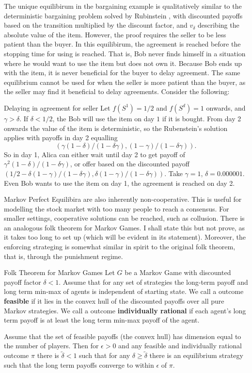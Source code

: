 The unique equilibirum in the bargaining example is qualitatively similar to the deterministic bargaining problem solved by Rubinstein \cite{Cripps1998}, with discounted payoffs based on the transition multiplied by the discount factor, and $v_\delta$ describing the absolute value of the item. However, the proof requires the seller to be less patient than the buyer. In this equilibirum, the agreement is reached before the stopping time for using is reached. That is, Bob never finds himself in a situation where he would want to use the item but does not own it. Because Bob ends up with the item, it is never beneficial for the buyer to delay agreement. The same equilibrium cannot be used for when the seller is more patient than the buyer, as the seller may find it beneficial to delay agreements. Consider the following:\begin{aexample}{Delaying in agreement for seller}{}
    Let $f(S^1)={1/2}$ and $f(S^d)=1$ onwards, and $\gamma >\delta$. If $\delta<1/2$, the Bob will use the item on day $1$ if it is bought. From day 2 onwards the value of the item is deterministic, so the Rubenstein's solution applies with payoffs in day 2 equalling \[
    (\gamma (1-\delta)/(1-\delta\gamma), (1-\gamma)/(1-\delta\gamma)).
    \] 
    So in day 1, Alica can either wait until day 2 to get payoff of $\gamma^2 (1-\delta)/(1-\delta\gamma)$, or offer based on the discounted payoff $(1/2 - \delta(1-\gamma)/(1-\delta\gamma),\delta(1-\gamma)/(1-\delta\gamma))$. Take $\gamma=1$, $\delta = 0.000001$. Even Bob wants to use the item on day 1, the agreement is reached on day 2.
\end{aexample}

Markov Perfect Equilibira are also inherently non-cooperative. This is useful for modelling the stock market with too many people to reach a consensus. For smaller settings, cooperative solutions can be reached, such as collusion. There is an analogous folk theorem for Markov Games. I shall state this but not prove, as it takes too long to set up (which will be evident in its statement). Moreover, the enforcing strateging is somewhat similar in spirit to the original folk theorem, that is, through the punishment regime. \begin{atheorem}{Folk Theorem for Markov Games \cite{Dutta1995}}{}
    Let $G$ be a Markov Game with discounted payoff factor $\delta<1$. Assume that for any set of strategies the long-term payoff and long term min-max of agents is independent of starting state.
    We call a outcome \textbf{feasible} if it lies in the convex hull of the discounted payoffs over all pure Markov strategies. We call a outcome \textbf{individually rational} if each agent's long term payoff is at least the long term min-max payoff of the agent. 
    
    Assume that the set of feasible payoffs (the convex hull) has dimension equal to the number of players. Then for $\epsilon>0$ and any feasible and individually rational outcome $\pi$ there is $\tilde{\delta}<1$ such that for any $\delta\geq \tilde{\delta}$ there is an equilibrium strategy such that the long term payoffs converge to within $\epsilon$ of $\pi$.
\end{atheorem}
